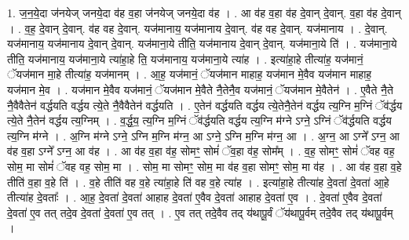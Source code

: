 \documentclass[17pt]{extarticle}
\begin{document}
1. ज॒न॒ये॒दा ज॑नयेज् जनये॒दा व॑ह व॒हा ज॑नयेज् जनये॒दा व॑ह । . आ व॑ह व॒हा व॑ह दे॒वान् दे॒वान्. व॒हा व॑ह दे॒वान् । . व॒ह॒ दे॒वान् दे॒वान्. व॑ह वह दे॒वान्. यज॑मानाय॒ यज॑मानाय दे॒वान्. व॑ह वह दे॒वान्. यज॑मानाय । . दे॒वान्. यज॑मानाय॒ यज॑मानाय दे॒वान् दे॒वान्. यज॑माना॒ये तीति॒ यज॑मानाय दे॒वान् दे॒वान्. यज॑माना॒ये ति॑ । . यज॑माना॒ये तीति॒ यज॑मानाय॒ यज॑माना॒ये त्या॑हा॒हे ति॒ यज॑मानाय॒ यज॑माना॒ये त्या॑ह । . इत्या॑हा॒हे तीत्या॑ह॒ यज॑मानं॒ ॅयज॑मान मा॒हे तीत्या॑ह॒ यज॑मानम् । . आ॒ह॒ यज॑मानं॒ ॅयज॑मान माहाह॒ यज॑मान मे॒वैव यज॑मान माहाह॒ यज॑मान मे॒व । . यज॑मान मे॒वैव यज॑मानं॒ ॅयज॑मान मे॒वैते नै॒तेनै॒व यज॑मानं॒ ॅयज॑मान मे॒वैतेन॑ । . ए॒वैते नै॒ते नै॒वैवैतेन॑ वर्द्धयति वर्द्धय त्ये॒ते नै॒वैवैतेन॑ वर्द्धयति । . ए॒तेन॑ वर्द्धयति वर्द्धय त्ये॒तेनै॒तेन॑ वर्द्धय त्य॒ग्नि म॒ग्निं ॅव॑र्द्धय त्ये॒ते नै॒तेन॑ वर्द्धय त्य॒ग्निम् । . व॒र्द्ध॒य॒ त्य॒ग्नि म॒ग्निं ॅव॑र्द्धयति वर्द्धय त्य॒ग्नि म॑ग्ने ऽग्ने॒ ऽग्निं ॅव॑र्द्धयति वर्द्धय त्य॒ग्नि म॑ग्ने । . अ॒ग्नि म॑ग्ने ऽग्ने॒ ऽग्नि म॒ग्नि म॑ग्न॒ आ ऽग्ने॒ ऽग्नि म॒ग्नि म॑ग्न॒ आ । . अ॒ग्न॒ आ ऽग्ने᳚ ऽग्न॒ आ व॑ह व॒हा ऽग्ने᳚ ऽग्न॒ आ व॑ह । . आ व॑ह व॒हा व॑ह॒ सोमꣳ॒॒ सोमं॑ ॅव॒हा व॑ह॒ सोम᳚म् । . व॒ह॒ सोमꣳ॒॒ सोमं॑ ॅवह वह॒ सोम॒ मा सोमं॑ ॅवह वह॒ सोम॒ मा । . सोम॒ मा सोमꣳ॒॒ सोम॒ मा व॑ह व॒हा सोमꣳ॒॒ सोम॒ मा व॑ह । . आ व॑ह व॒हा व॒हे तीति॑ व॒हा व॒हे ति॑ । . व॒हे तीति॑ वह व॒हे त्या॑हा॒हे ति॑ वह व॒हे त्या॑ह । . इत्या॑हा॒हे तीत्या॑ह दे॒वता॑ दे॒वता॑ आ॒हे तीत्या॑ह दे॒वताः᳚ । . आ॒ह॒ दे॒वता॑ दे॒वता॑ आहाह दे॒वता॑ ए॒वैव दे॒वता॑ आहाह दे॒वता॑ ए॒व । . दे॒वता॑ ए॒वैव दे॒वता॑ दे॒वता॑ ए॒व तत् तदे॒व दे॒वता॑ दे॒वता॑ ए॒व तत् । . ए॒व तत् तदे॒वैव तद् य॑थापू॒र्वं ॅय॑थापू॒र्वम् तदे॒वैव तद् य॑थापू॒र्वम् । \newline
\end{document}
